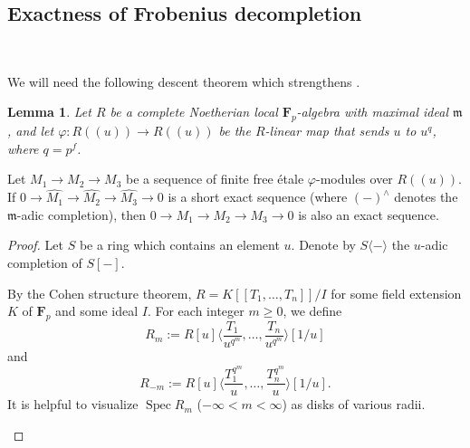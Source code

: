 \documentclass[11pt]{amsart}
\newtheorem{lem}{Lemma}
\numberwithin{thm}{section}
\numberwithin{lem}{section}
\numberwithin{cor}{section}
\numberwithin{prop}{section}
\numberwithin{exam}{section}
\numberwithin{dfn}{section}
\newcommand{\spec}{\operatorname{Spec}}
\newcommand{\mychapter}{\section}
\newcommand{\fm}{\mathfrak{m}}
\newcommand{\F}{\mathbf{F}}
\begin{document}
\begin{appendices}
\mychapter{Exactness of Frobenius decompletion}~

We will need the following descent theorem
which strengthens \cite[Theorem 5.5.20]{EG21}.

\begin{lem}
\label{lem-eff1}
Let $R$ be a complete Noetherian local $\F_p$-algebra with
maximal ideal $\fm$,
and let $\varphi: R(\!(u)\!)\to R(\!(u)\!)$
be the $R$-linear map that sends $u$ to $u^q$,
where $q=p^f$.
\end{lem}


Let $M_1\to M_2\to M_3$ be a sequence of finite free
\'etale $\varphi$-modules over $R(\!(u)\!)$.
If $0\to \widehat{M_1}\to\widehat{M_2}\to \widehat{M_3}\to 0$
is a short exact sequence
(where $(-)^{\wedge}$ denotes the $\fm$-adic completion),
then $0\to M_1\to M_2\to M_3\to 0$ is also an exact sequence.

\begin{proof}
Let $S$ be a ring which contains an element $u$.
Denote by $S\langle - \rangle$ the $u$-adic completion of $S[-]$.

By the Cohen structure theorem,
$R = K[[T_1, \dots, T_n]]/I$ for some field extension $K$ of 
$\F_p$
and some ideal $I$.
For each integer $m \ge 0$, we define
$$
R_{m} := R[u]\langle \frac{T_1}{u^{q^m}},\dots, \frac{T_n}{u^{q^m}}\rangle[1/u]
$$
and
$$
R_{-m} := R[u]\langle \frac{T_1^{q^m}}{u},\dots, \frac{T_n^{q^m}}{u}\rangle[1/u].
$$
It is helpful to visualize $\spec R_m$ ($-\infty < m < \infty$) as disks of various radii.
\begin{center}
\end{center}


\end{proof}
\end{appendices}
\end{document}
